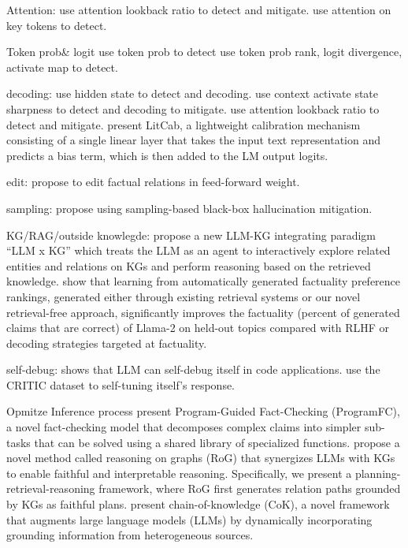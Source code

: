Attention:
\cite{chuang2024lookback} use attention lookback ratio to detect and mitigate.
\cite{yuksekgonul2023attention} use attention on key tokens to detect.

Token prob\& logit
\cite{quevedo2024detecting} use token prob to detect
\cite{he2024llm} use token prob rank, logit divergence, activate map to detect.



decoding:
\cite{azaria2023internal} use hidden state to detect and decoding.
\cite{chen2024context} use context activate state sharpness to detect and decoding to mitigate.
\cite{chuang2024lookback} use attention lookback ratio to detect and mitigate.
\cite{liu2024litcab} present LitCab, a lightweight calibration mechanism consisting of a single linear layer that takes the input text representation and predicts a bias term, which is then added to the LM output logits.

edit:
\cite{meng2023locating} propose to edit factual relations in feed-forward weight.

sampling:
\cite{manakul2023self} propose using sampling-based black-box hallucination mitigation.

KG/RAG/outside knowlegde:
\cite{sun2024thinkongraph} propose a new LLM-KG integrating paradigm ``LLM x KG'' which treats the LLM as an agent to interactively explore related entities and relations on KGs and perform reasoning based on the retrieved knowledge.
\cite{luo2024reasoning}
\cite{li2024chainofknowledge}
\cite{tian2024finetuning} show that learning from automatically generated factuality preference rankings, generated either through existing retrieval systems or our novel retrieval-free approach, significantly improves the factuality (percent of generated claims that are correct) of Llama-2 on held-out topics compared with RLHF or decoding strategies targeted at factuality.

self-debug:
\cite{chen2024teaching} shows that LLM can self-debug itself in code applications.
\cite{gou2024critic} use the CRITIC dataset to self-tuning itself's response.

Opmitze Inference process
\cite{pan2023fact} present Program-Guided Fact-Checking (ProgramFC), a novel fact-checking model that decomposes complex claims into simpler sub-tasks that can be solved using a shared library of specialized functions.
\cite{luo2024reasoning} propose a novel method called reasoning on graphs (RoG) that synergizes LLMs with KGs to enable faithful and interpretable reasoning. Specifically, we present a planning-retrieval-reasoning framework, where RoG first generates relation paths grounded by KGs as faithful plans.
\cite{li2024chainofknowledge} present chain-of-knowledge (CoK), a novel framework that augments large language models (LLMs) by dynamically incorporating grounding information from heterogeneous sources.

